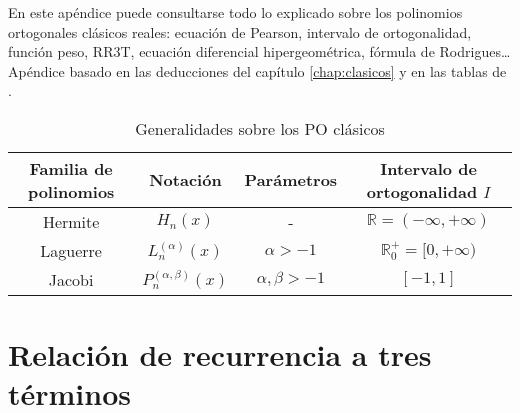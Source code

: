 
En este apéndice puede consultarse todo lo explicado sobre los polinomios ortogonales clásicos reales: ecuación de Pearson, intervalo de ortogonalidad, función peso, RR3T, ecuación diferencial hipergeométrica, fórmula de Rodrigues\dots Apéndice basado en las deducciones del capítulo \ref{chap:clasicos} y en las tablas de \cite[Ch. 22]{abramowitz-stegun}.

\begin{table}[h]
    \centering
    \begin{tabular}{cccc}
    \hline
    \textbf{Familia de polinomios} & \textbf{Notación}                  & \textbf{Parámetros}        & \textbf{Intervalo de ortogonalidad} $I$                                               \\ \hline\hline
    Hermite               & $H_n(x)$                  & -                 & $\mathbb R = (-\infty,+\infty)$ \\ \hline
    Laguerre              & $L_n^{(\alpha)}(x)$       & $\alpha>-1$       & $\mathbb R^+_0 = [0,+\infty)$                                                \\ \hline
    Jacobi                & $P_n^{(\alpha,\beta)}(x)$ & $\alpha,\beta>-1$ & $[-1,1]$                                                                     \\ \hline
    \end{tabular}
    \caption{Generalidades sobre los PO clásicos}
    \label{tab:generalidades-clasicos}
    \end{table}

\section{Relación de recurrencia a tres términos}

